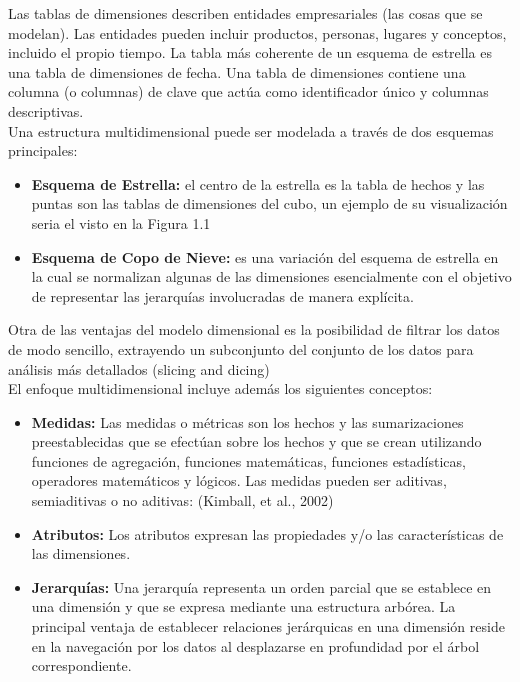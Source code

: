 Las tablas de dimensiones describen entidades empresariales (las cosas que se modelan). Las entidades pueden incluir productos, personas, lugares y conceptos, incluido el propio tiempo. La tabla más coherente de un esquema de estrella es una tabla de dimensiones de fecha. Una tabla de dimensiones contiene una columna (o columnas) de clave que actúa como identificador único y columnas descriptivas.\\

Una estructura multidimensional puede ser modelada a través de dos esquemas principales:

\begin{itemize}
\item \textbf{Esquema de Estrella:} el centro de la estrella es la tabla de hechos y las puntas son las tablas de dimensiones del cubo, un ejemplo de su visualización seria el visto en la Figura 1.1
\item \textbf{Esquema de Copo de Nieve:} es una variación del esquema de estrella en la cual se normalizan algunas de las dimensiones esencialmente con el objetivo de representar las jerarquías involucradas de manera explícita.
\end{itemize}

Otra de las ventajas del modelo dimensional es la posibilidad de filtrar los datos de modo sencillo, extrayendo un subconjunto del conjunto de los datos para análisis más detallados (slicing and dicing)\\



El enfoque multidimensional incluye además los siguientes conceptos:
\begin{itemize}
\item \textbf{Medidas:} Las medidas o métricas son los hechos y las sumarizaciones preestablecidas que se efectúan sobre los hechos y que se crean utilizando funciones de agregación, funciones matemáticas, funciones estadísticas, operadores matemáticos y lógicos. Las medidas pueden ser aditivas, semiaditivas o no aditivas: (Kimball, et al., 2002)
\item \textbf{Atributos:} Los atributos expresan las propiedades y/o las características de las dimensiones. 
\item \textbf{Jerarquías:} Una jerarquía representa un orden parcial que se establece en una dimensión y que se expresa mediante una estructura arbórea. La principal ventaja de establecer relaciones jerárquicas en una dimensión reside en la navegación por los datos al desplazarse en profundidad por el árbol correspondiente.
\end{itemize}

